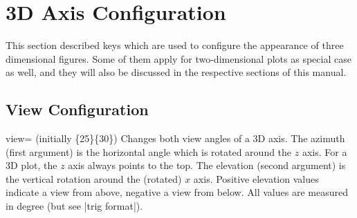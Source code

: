 
\section{3D Axis Configuration}
\label{sec:3d:axis:config}

{

This section described keys which are used to configure the appearance of three
dimensional figures. Some of them apply for two-dimensional plots as special
case as well, and they will also be discussed in the respective sections of
this manual.


\subsection{View Configuration}

\begin{pgfplotskey}{view= (initially \{25\}\{30\})}
%
%
    Changes both view angles of a 3D axis. The azimuth (first argument) is the
    horizontal angle which is rotated around the $z$ axis. For a 3D plot, the
    $z$ axis always points to the top. The elevation (second argument) is the
    vertical rotation around the (rotated) $x$ axis. Positive elevation values
    indicate a view from above, negative a view from below. All values are
    measured in degree (but see |trig format|).
\pgfplotsexpensiveexample
\begin{codeexample}[]
\end{codeexample}

\pgfplotsexpensiveexample
\begin{codeexample}[]
\end{codeexample}

\pgfplotsexpensiveexample
\begin{codeexample}[]
\end{codeexample}


\end{pgfplotskey}}
